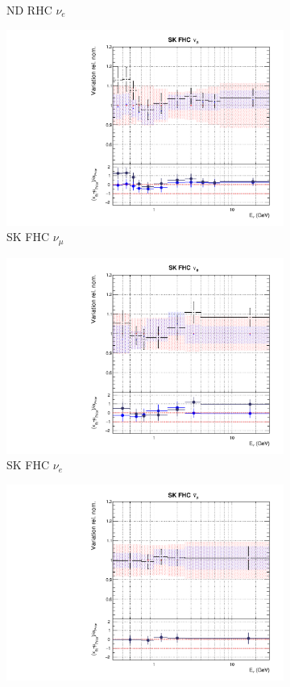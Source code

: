 \begin{figure}[t]
\begin{subfigure}{0.24\textwidth}
  \caption{ND RHC $\nu_e$}
\end{subfigure}
\begin{subfigure}{0.24\textwidth}
  \centering
  \includegraphics[width=0.95\linewidth]{figs/rhcmpdat28flux_8}
  \caption{SK FHC $\nu_{\mu}$}
\end{subfigure}
\begin{subfigure}{0.24\textwidth}
  \centering
  \includegraphics[width=0.95\linewidth]{figs/rhcmpdat28flux_9}
  \caption{SK FHC $\nu_e$}
\end{subfigure}
\begin{subfigure}{0.24\textwidth}
  \centering
  \includegraphics[width=0.95\linewidth]{figs/rhcmpdat248flux_10}

\end{subfigure}
\end{figure}
